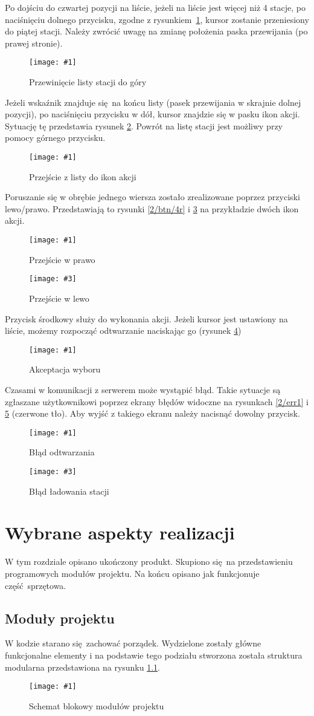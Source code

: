 \documentclass[polish]{aghengthesis}
\newcommand{\imgint}[4]{
	\begin{figure}[{#4}]
		\centering
		\texttt{[image: \#1]}
		\caption{#2}
		\label{#1}
	\end{figure}
}
\newcommand{\imgh}[3]{\imgint{#1}{#2}{#3}{H}}
\newcommand{\imgintss}[5]{
	\begin{figure}[{#5}]
		\centering
		\begin{minipage}{.45\textwidth}
			\centering
			\texttt{[image: \#1]}
			\caption{#2}
			\label{#1}
		\end{minipage}%
		\hfill
		\begin{minipage}{.45\textwidth}
			\centering
			\texttt{[image: \#3]}
			\caption{#4}
			\label{#3}
		\end{minipage}
	\end{figure}
}
\newcommand{\imghss}[4]{\imgintss{#1}{#2}{#3}{#4}{H}}
\begin{document}
		Po dojściu do czwartej pozycji na liście, jeżeli na liście jest więcej niż 4 stacje, po naciśnięciu dolnego przycisku, zgodne z rysunkiem~\ref{2/btn/2}, kursor zostanie przeniesiony do piątej stacji. Należy zwrócić uwagę na zmianę położenia paska przewijania (po prawej stronie).
		\imgh{2/btn/2}{Przewinięcie listy stacji do góry}{0.7}
		
		Jeżeli wskaźnik znajduje się na końcu listy (pasek przewijania w skrajnie dolnej pozycji), po naciśnięciu przycisku w dół, kursor znajdzie się w pasku ikon akcji. Sytuację tę przedstawia rysunek \ref{2/btn/3}. Powrót na listę stacji jest możliwy przy pomocy górnego przycisku.
		\imgh{2/btn/3}{Przejście z listy do ikon akcji}{0.7}
		
		Poruszanie się w obrębie jednego wiersza zostało zrealizowane poprzez przyciski \mbox{lewo/prawo}. Przedstawiają to rysunki \ref{2/btn/4r} i \ref{2/btn/4l} na przykładzie dwóch ikon akcji.
		\imghss{2/btn/4r}{Przejście w prawo}{2/btn/4l}{Przejście w lewo}
		
		Przycisk środkowy służy do wykonania akcji. Jeżeli kursor jest ustawiony na liście, możemy rozpocząć odtwarzanie naciskając go (rysunek \ref{2/btn/5})
		\imgh{2/btn/5}{Akceptacja wyboru}{0.7}
				
		Czasami w komunikacji z serwerem może wystąpić błąd. Takie sytuacje są zgłaszane użytkownikowi poprzez ekrany błędów widoczne na rysunkach \ref{2/err1} i \ref{2/err2} (czerwone tło). Aby wyjść z takiego ekranu należy nacisnąć dowolny przycisk.
		\imghss{2/err1}{Błąd odtwarzania}{2/err2}{Błąd ładowania stacji}

\chapter{Wybrane aspekty realizacji}
	W tym rozdziale opisano ukończony produkt.
	Skupiono się na przedstawieniu programowych modułów projektu. Na końcu opisano jak funkcjonuje część sprzętowa.
	
	\section{Moduły projektu}
		W kodzie starano się zachować porządek. Wydzielone zostały główne funkcjonalne elementy i na podstawie tego podziału stworzona została struktura modularna przedstawiona na rysunku \ref{3/PicoRadio-code-block-diagram}.
		\imgh{3/PicoRadio-code-block-diagram}{Schemat blokowy modułów projektu}{0.75}
		
\end{document}
